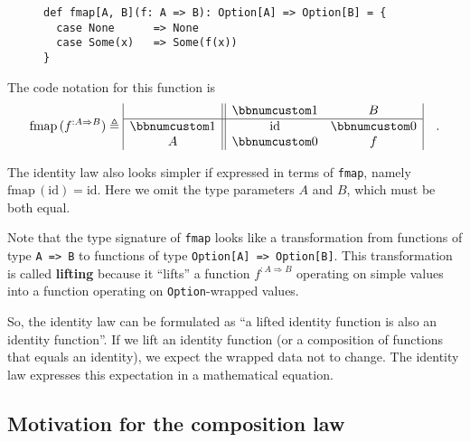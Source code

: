 \begin{wrapfigure}{l}{0.55\columnwidth}%
\vspace{-0\baselineskip}
\begin{lstlisting}
def fmap[A, B](f: A => B): Option[A] => Option[B] = {
  case None      => None
  case Some(x)   => Some(f(x))
}
\end{lstlisting}
\vspace{-2\baselineskip}
\end{wrapfigure}%
The code notation for this function is
\begin{equation}
\text{fmap}\,(f^{:A\Rightarrow B})\triangleq\begin{array}{|c||cc|}
 & \bbnum 1 & B\\
\hline \bbnum 1 & \text{id} & \bbnum 0\\
A & \bbnum 0 & f
\end{array}\quad.\label{eq:f-def-opt-fmap-matrix-notation}
\end{equation}
\vspace{-0.5\baselineskip}

The identity law also looks simpler if expressed in terms of \lstinline!fmap!,
namely $\text{fmap}\,(\text{id})=\text{id}$. Here we omit the type
parameters $A$ and $B$, which must be both equal.

Note that the type signature of \lstinline!fmap! looks like a transformation
from functions of type \lstinline!A => B! to functions of type \lstinline!Option[A] => Option[B]!.
This transformation is called \textbf{lifting} because
it ``lifts'' a function $f^{:A\Rightarrow B}$ operating on simple
values into a function operating on \lstinline!Option!-wrapped values. 

So, the identity law can be formulated as ``a lifted identity function
is also an identity function''. If we lift an identity function (or
a composition of functions that equals an identity), we expect the
wrapped data not to change. The identity law expresses this expectation
in a mathematical equation.

\subsection{Motivation for the composition law}

